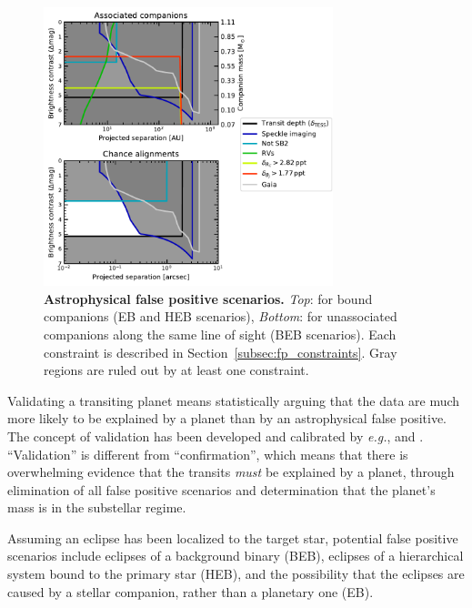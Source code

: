 \documentclass[12pt,twocolumn,tighten]{aastex63}
\begin{document}
\begin{figure}[!t]
	\begin{center}
		\leavevmode
		\includegraphics[width=0.75\textwidth]{f6.pdf}
	\end{center}
	\vspace{-0.6cm}
	\caption{
    {\bf Astrophysical false positive scenarios.} {\it Top}: for bound
    companions (EB and HEB scenarios), {\it Bottom}: for unassociated
    companions along the same line of sight (BEB scenarios).  Each
    constraint is described in Section~\ref{subsec:fp_constraints}.
    Gray regions are ruled out by at least one constraint.
		\label{fig:fpscenario}
	}
\end{figure}

Validating a transiting planet means statistically arguing that the
data are much more likely to be explained by a planet than by an
astrophysical false positive. The concept of validation has been
developed and calibrated by {\it e.g.},
\citet{torres_modeling_2011,morton_efficient_2012,diaz_pastis_2014,santerne_pastis_2015,morton_false_2016}
and \citet{giacalone_triceratops_2020}.  ``Validation'' is different
from ``confirmation'', which means that there is overwhelming evidence
that the transits {\it must} be explained by a planet, through
elimination of all false positive scenarios and determination that the
planet's mass is in the substellar regime.

Assuming an eclipse has been localized to the target star, potential
false positive scenarios include eclipses of a
background binary (BEB), eclipses of a hierarchical system bound to
the primary star (HEB), and the possibility that the eclipses are
caused by a stellar companion, rather than a planetary one (EB).
\end{document}
